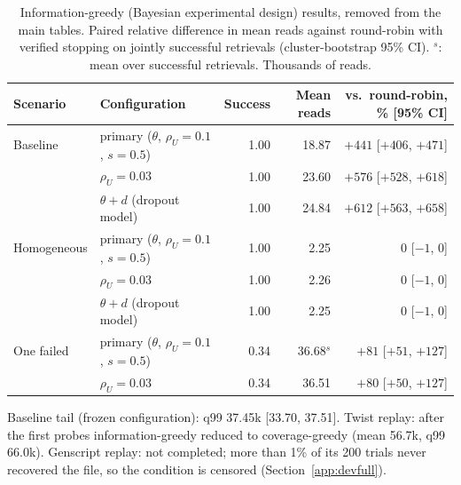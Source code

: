 \begin{table}[!ht]
\centering
\caption{Information-greedy (Bayesian experimental design) results, removed from the main tables.  Paired relative difference in mean reads against round-robin with verified stopping on jointly successful retrievals (cluster-bootstrap 95\% CI).  $^{s}$: mean over successful retrievals.  Thousands of reads.}
\label{tab:suppinfo}
\scriptsize
\setlength{\tabcolsep}{3pt}
\begin{tabular}{@{}llrrr@{}}
\toprule
Scenario & Configuration & Success & Mean reads & vs.\ round-robin, \% [95\% CI] \\
\midrule
Baseline & primary ($\theta$, $\rho_U{=}0.1$, $s{=}0.5$) & 1.00 & 18.87 & $+441$ [$+406$, $+471$] \\
 & $\rho_U{=}0.03$ & 1.00 & 23.60 & $+576$ [$+528$, $+618$] \\
 & $\theta{+}d$ (dropout model) & 1.00 & 24.84 & $+612$ [$+563$, $+658$] \\
Homogeneous & primary ($\theta$, $\rho_U{=}0.1$, $s{=}0.5$) & 1.00 & 2.25 & $0$ [$-1$, $0$] \\
 & $\rho_U{=}0.03$ & 1.00 & 2.26 & $0$ [$-1$, $0$] \\
 & $\theta{+}d$ (dropout model) & 1.00 & 2.25 & $0$ [$-1$, $0$] \\
One failed & primary ($\theta$, $\rho_U{=}0.1$, $s{=}0.5$) & 0.34 & 36.68$^{s}$ & $+81$ [$+51$, $+127$] \\
 & $\rho_U{=}0.03$ & 0.34 & 36.51 & $+80$ [$+50$, $+127$] \\
\bottomrule
\end{tabular}

\vspace{2pt}
\parbox{\columnwidth}{\scriptsize Baseline tail (frozen configuration): q99 37.45k [33.70, 37.51].  Twist replay: after the first probes information-greedy reduced to coverage-greedy (mean 56.7k, q99 66.0k).  Genscript replay: not completed; more than 1\% of its 200 trials never recovered the file, so the condition is censored (Section~\ref{app:devfull}).}
\end{table}
